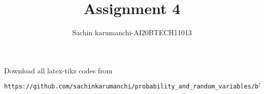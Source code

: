 \documentclass[journal,12pt,twocolumn]{IEEEtran}
\DeclareMathOperator*{\Res}{Res}
\begin{document}
\newcommand{\BEQA}{\begin{eqnarray}}
\newcommand{\EEQA}{\end{eqnarray}}
\newcommand{\define}{\stackrel{\triangle}{=}}

\raggedbottom
\setlength{\parindent}{0pt}
\providecommand{\mbf}{\mathbf}
\providecommand{\pr}[1]{\ensuremath{\Pr\left(#1\right)}}
\providecommand{\qfunc}[1]{\ensuremath{Q\left(#1\right)}}
\providecommand{\sbrak}[1]{\ensuremath{{}\left[#1\right]}}
\providecommand{\lsbrak}[1]{\ensuremath{{}\left[#1\right.}}
\providecommand{\rsbrak}[1]{\ensuremath{{}\left.#1\right]}}
\providecommand{\brak}[1]{\ensuremath{\left(#1\right)}}
\providecommand{\lbrak}[1]{\ensuremath{\left(#1\right.}}
\providecommand{\rbrak}[1]{\ensuremath{\left.#1\right)}}
\providecommand{\cbrak}[1]{\ensuremath{\left\{#1\right\}}}
\providecommand{\lcbrak}[1]{\ensuremath{\left\{#1\right.}}
\providecommand{\rcbrak}[1]{\ensuremath{\left.#1\right\}}}
\theoremstyle{remark}
\newtheorem{rem}{Remark}
\newcommand{\sgn}{\mathop{\mathrm{sgn}}}
\providecommand{\abs}[1]{\vert#1\vert}
\providecommand{\res}[1]{\Res\displaylimits_{#1}} 
\providecommand{\norm}[1]{\lVert#1\rVert}
\providecommand{\mtx}[1]{\mathbf{#1}}
\providecommand{\mean}[1]{E[ #1 ]}
\providecommand{\fourier}{\overset{\mathcal{F}}{ \rightleftharpoons}}
\providecommand{\system}{\overset{\mathcal{H}}{ \longleftrightarrow}}
\newcommand{\solution}{\noindent \textbf{Solution: }}
\newcommand{\cosec}{\,\text{cosec}\,}
\providecommand{\dec}[2]{\ensuremath{\overset{#1}{\underset{#2}{\gtrless}}}}
\newcommand{\myvec}[1]{\ensuremath{\begin{pmatrix}#1\end{pmatrix}}}
\newcommand{\mydet}[1]{\ensuremath{\begin{vmatrix}#1\end{vmatrix}}}
\makeatletter
{}
\makeatother
\let\StandardTheFigure\thefigure
\let\vec\mathbf
\renewcommand{\thefigure}{\theproblem}
\def\putbox#1#2#3{\makebox[0in][l]{\makebox[#1][l]{}\raisebox{\baselineskip}[0in][0in]{\raisebox{#2}[0in][0in]{#3}}}}
     \def\rightbox#1{\makebox[0in][r]{#1}}
     \def\centbox#1{\makebox[0in]{#1}}
     \def\topbox#1{\raisebox{-\baselineskip}[0in][0in]{#1}}
     \def\midbox#1{\raisebox{-0.5\baselineskip}[0in][0in]{#1}}
\vspace{3cm}
\title{Assignment 4}
\author{Sachin karumanchi-AI20BTECH11013}
\maketitle
\newpage
\bigskip
\renewcommand{\thefigure}{\theenumi}
\renewcommand{\thetable}{\theenumi}
Download all latex-tikz codes from 
\begin{lstlisting}
https://github.com/sachinkarumanchi/probability_and_random_variables/blob/assignment4/Assignment4.tex
\end{lstlisting}
\end{document}
